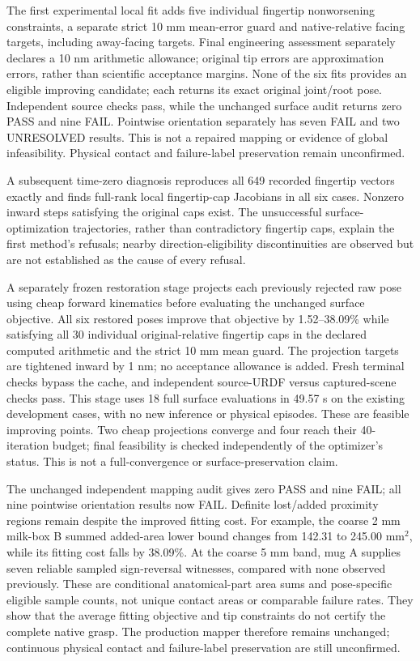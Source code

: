 \documentclass[10pt,letterpaper]{article}
\begin{document}
The first experimental local fit adds five individual fingertip nonworsening
constraints, a separate strict 10 mm mean-error guard and native-relative facing
targets, including away-facing targets. Final engineering assessment separately
declares a 10 nm arithmetic allowance; original tip errors are approximation
errors, rather than scientific acceptance margins. None of the six fits provides
an eligible improving candidate; each returns its exact original joint/root pose.
Independent source checks pass, while the unchanged surface audit returns zero
PASS and nine FAIL. Pointwise orientation separately has seven FAIL and two
UNRESOLVED results. This is not a repaired mapping or evidence of global
infeasibility. Physical contact and failure-label preservation remain unconfirmed.


A subsequent time-zero diagnosis reproduces all 649 recorded fingertip vectors
exactly and finds full-rank local fingertip-cap Jacobians in all six cases.
Nonzero inward steps satisfying the original caps exist. The unsuccessful
surface-optimization trajectories, rather than contradictory fingertip caps,
explain the first method's refusals; nearby direction-eligibility discontinuities
are observed but are not established as the cause of every refusal.

A separately frozen restoration stage projects each previously rejected raw
pose using cheap forward kinematics before evaluating the unchanged surface
objective. All six restored poses improve that objective by 1.52--38.09\% while
satisfying all 30 individual original-relative fingertip caps in the declared
computed arithmetic and the strict 10 mm mean guard. The projection targets
are tightened inward by 1 nm; no acceptance allowance is added. Fresh terminal
checks bypass the cache, and independent source-URDF versus captured-scene
checks pass. This stage uses 18 full surface evaluations in 49.57 s on the
existing development cases, with no new inference or physical episodes. These
are feasible improving points. Two cheap projections converge and four reach
their 40-iteration budget; final feasibility is checked independently of the
optimizer's status. This is not a full-convergence or surface-preservation claim.

The unchanged independent mapping audit gives zero PASS and nine FAIL; all
nine pointwise orientation results now FAIL. Definite lost/added proximity
regions remain despite the improved fitting cost. For example, the coarse
2 mm milk-box B summed added-area lower bound changes from 142.31 to
245.00 mm$^2$, while its fitting cost falls by 38.09\%. At the coarse 5 mm
band, mug A supplies seven reliable sampled sign-reversal witnesses, compared
with none observed previously. These are conditional anatomical-part area
sums and pose-specific eligible sample counts, not unique contact areas or
comparable failure rates. They show that the average fitting objective and
tip constraints do not certify the complete native grasp. The production
mapper therefore remains unchanged; continuous physical contact and
failure-label preservation are still unconfirmed.
\end{document}
